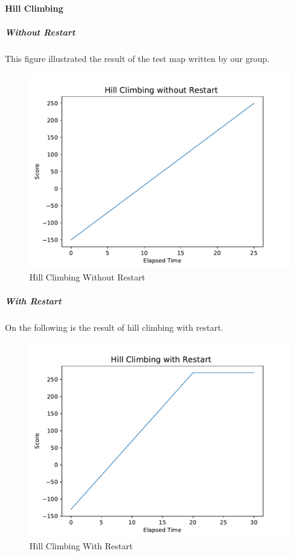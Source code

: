 \documentclass[11pt, a4paper]{article}
\begin{document}
\paragraph{Hill Climbing}


\subparagraph{Without Restart}

This figure illustrated the result of the test map written by our group.

\begin{figure}[htbp]
	\centering 
	\includegraphics[scale=0.5]{up2_1}
	\caption{Hill Climbing Without Restart} %
\end{figure}

\newpage

\subparagraph{With Restart}

On the following is the result of hill climbing with restart.


\begin{figure}[htbp]
	\centering 
	\includegraphics[scale=0.5]{up2_2}
	\caption{Hill Climbing With Restart} %
\end{figure}
\end{document}
